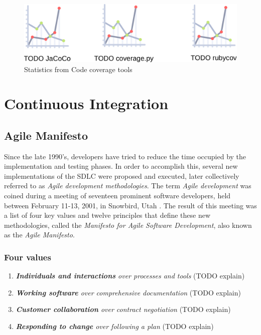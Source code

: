 \begin{figure}[htbp!]
	\centering
	\includegraphics[width=\textwidth]{assets/coverage.pdf}
	\caption{Statistics from Code coverage tools}
	\label{fig:coverage-statistics}
\end{figure}

\section{Continuous Integration}
\subsection{Agile Manifesto}
Since the late 1990's, developers have tried to reduce the time occupied by the implementation and testing phases. In order to accomplish this, several new implementations of the SDLC were proposed and executed, later collectively referred to as \emph{Agile development methodologies}. The term \emph{Agile development} was coined during a meeting of seventeen prominent software developers, held between February 11-13, 2001, in Snowbird, Utah \cite{jimhighsmith2001}. The result of this meeting was a list of four key values and twelve principles that define these new methodologies, called the \emph{Manifesto for Agile Software Development}, also known as the \emph{Agile Manifesto}.

\subsubsection{Four values}

\begin{enumerate}
	\item \emph{\textbf{Individuals and interactions} over processes and tools} (TODO explain)
	\item \emph{\textbf{Working software} over comprehensive documentation} (TODO explain)
	\item \emph{\textbf{Customer collaboration} over contract negotiation} (TODO explain)
	\item \emph{\textbf{Responding to change} over following a plan} (TODO explain)
\end{enumerate}

